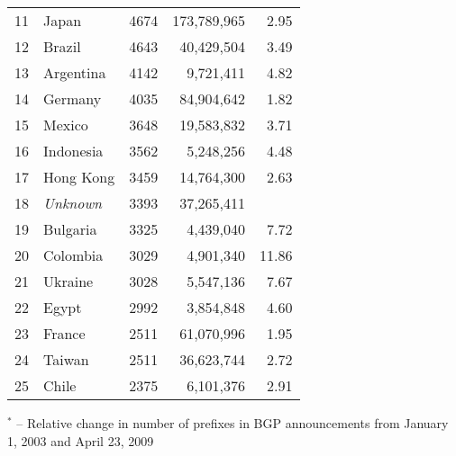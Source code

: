 \begin{table*}[p]
\begin{minipage}[t]{0.48\textwidth}
\begin{center}
\begin{tabular}{|l||l|r|r|r|}
11      &       Japan   		&       4674    &       173,789,965     & 2.95			\tabularnewline %
12      &       Brazil  		&       4643    &       40,429,504      & 3.49			\tabularnewline %
13      &       Argentina       &       4142    &       9,721,411       & 4.82			\tabularnewline %
14      &       Germany 		&       4035    &       84,904,642      & 1.82			\tabularnewline %
15      &       Mexico  		&       3648    &       19,583,832      & 3.71			\tabularnewline %
16      &       Indonesia       &       3562    &       5,248,256       & 4.48			\tabularnewline %
17      &       Hong Kong       &       3459    &       14,764,300      & 2.63			\tabularnewline %
18      &       \emph{Unknown}	&       3393    &       37,265,411      & 				\tabularnewline %
19      &       Bulgaria        &       3325    &       4,439,040       & 7.72			\tabularnewline %
20      &       Colombia        &       3029    &       4,901,340       & 11.86			\tabularnewline %
21      &       Ukraine 		&       3028    &       5,547,136       & 7.67			\tabularnewline %
22      &       Egypt  			&       2992    &       3,854,848       & 4.60			\tabularnewline %
23      &       France 			&       2511    &       61,070,996      & 1.95			\tabularnewline %
24      &       Taiwan 			&       2511    &       36,623,744      & 2.72			\tabularnewline %
25      &       Chile  			&       2375    &       6,101,376       & 2.91			\tabularnewline %
	\hline
	\end{tabular}
	\end{center}
	
	\small	$^{*}$ -- Relative change in number of prefixes in BGP announcements from January 1, 2003 and April 23, 2009
\end{minipage}

\vspace{1cm}


\end{table*}
